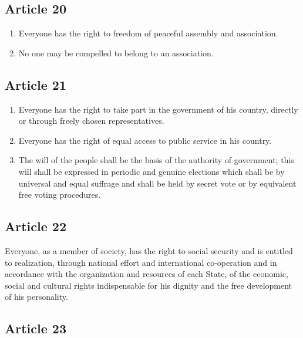 \documentclass[
  titlepage,
  openright,
  DIV=calc,
  toc=listof,
  listof=nochaptergap]{scrbook}
\begin{document}
\subsection{Article 20}\label{article-20-2}

\begin{enumerate}
\def\labelenumi{\arabic{enumi}.}
\item
  Everyone has the right to freedom of peaceful assembly and
  association.
\item
  No one may be compelled to belong to an association.
\end{enumerate}

\subsection{Article 21}\label{article-21-2}

\begin{enumerate}
\def\labelenumi{\arabic{enumi}.}
\item
  Everyone has the right to take part in the government of his country,
  directly or through freely chosen representatives.
\item
  Everyone has the right of equal access to public service in his
  country.
\item
  The will of the people shall be the basis of the authority of
  government; this will shall be expressed in periodic and genuine
  elections which shall be by universal and equal suffrage and shall be
  held by secret vote or by equivalent free voting procedures.
\end{enumerate}

\subsection{Article 22}\label{article-22-2}

Everyone, as a member of society, has the right to social security and
is entitled to realization, through national effort and international
co-operation and in accordance with the organization and resources of
each State, of the economic, social and cultural rights indispensable
for his dignity and the free development of his personality.

\subsection{Article 23}\label{article-23-2}
\end{document}
